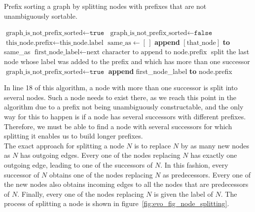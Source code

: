\documentclass[a4paper,12pt,twoside,BCOR=10mm]{scrbook}
\begin{document}
\begin{algorithm}
\caption[Prefix sort a graph]{Prefix sorting a graph by splitting nodes with prefixes that are not unambiguously sortable.}
\label{alg:workOnAutomatonPrefixes}
\begin{algorithmic}[1]
\State $ \textrm{graph\_is\_not\_prefix\_sorted} \gets \texttt{true} $
	\State $ \textrm{graph\_is\_not\_prefix\_sorted} \gets \texttt{false} $
		\State $ \textrm{this\_node.prefix} \gets \textrm{this\_node.label} $
	\EndFor
		\State $ \textrm{same\_as} \gets [ \, ] $
				\State \textbf{append} $ [\textrm{that\_node}] $ \textbf{to} same\_as
			\EndIf
		\EndFor
				\State $ \textrm{first\_node\_label} \gets \textrm{next character to append to node.prefix} $
					\State split the last node whose label was added to the prefix and which
						\State \phantom{first} has more than one successor
					\State $ \textrm{graph\_is\_not\_prefix\_sorted} \gets \texttt{true} $
				\Else
					\State \textbf{append} first\_node\_label \textbf{to} node.prefix
				\EndIf
			\EndFor
		\EndIf
	\EndFor
\EndWhile
\end{algorithmic}
\end{algorithm}
In line 18 of this algorithm, a node with more than one successor is split into several nodes.
Such a node needs to exist there, as we reach this point in the algorithm due to a prefix
not being unambiguously constructable, and the only way for this to happen is if a node has
several successors with different prefixes. Therefore, we must be able to find a node with
several successors for which splitting it enables us to build longer prefixes. \\
The exact approach for splitting a node $ N $ is to replace $ N $ by as many new nodes as $ N $ has
outgoing edges.
Every one of the nodes replacing $ N $ has exactly one outgoing edge, leading to
one of the successors of $ N $.
In this fashion, every successor of $ N $ obtains one of the nodes replacing $ N $ as predecessors.
Every one of the new nodes also obtains incoming edges to all the nodes that are predecessors of $ N $.
Finally, every one of the nodes replacing $ N $ is given the label of $ N $.
The process of splitting a node is shown in figure~\ref{fig:evo_fig_node_splitting}.
\end{document}
